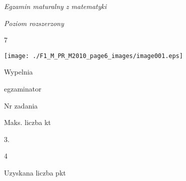 \documentclass[a4paper,12pt]{article}
\begin{document}
{\it Egzamin maturalny z matematyki}

{\it Poziom rozszerzony}

7
\begin{center}
\texttt{[image: ./F1\_M\_PR\_M2010\_page6\_images/image001.eps]}
\end{center}
Wypelnia

egzaminator

Nr zadania

Maks. liczba kt

3.

4

Uzyskana liczba pkt
\end{document}

